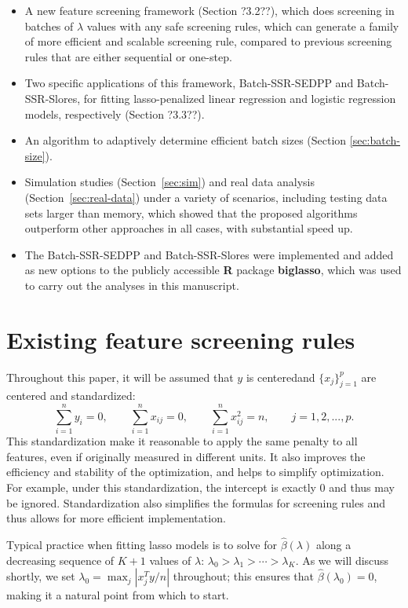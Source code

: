 \documentclass{article}
\begin{document}
\begin{itemize}
    \item A new feature screening framework (Section ?3.2??), which does screening in batches of $\lambda$ values with any safe screening rules, which can generate a family of more efficient and scalable screening rule, compared to previous screening rules that are either sequential or one-step.
    \item Two specific applications of this framework, Batch-SSR-SEDPP and Batch-SSR-Slores, for fitting lasso-penalized linear regression and logistic regression models, respectively (Section ?3.3??).
    \item An algorithm to adaptively determine efficient batch sizes (Section \ref{sec:batch-size}).
    \item Simulation studies (Section~\ref{sec:sim}) and real data analysis (Section~\ref{sec:real-data}) under a variety of scenarios, including testing data sets larger than memory, which showed that the proposed algorithms outperform other approaches in all cases, with substantial speed up.
    \item The Batch-SSR-SEDPP and Batch-SSR-Slores were implemented and added as new options to the publicly accessible \textbf{R} package \textbf{biglasso}\cite{zeng2017biglasso}, which was used to carry out the analyses in this manuscript.
\end{itemize}

\section{Existing feature screening rules}
\label{sec:existing}

Throughout this paper, it will be assumed that $y$ is centeredand $\{x_j\}_{j=1}^p$ are centered and standardized:
\begin{equation}
    \sum_{i=1}^ny_i=0, \qquad \sum_{i=1}^n x_{ij}=0, \qquad \sum_{i=1}^n x_{ij}^2=n,\qquad j=1,2,...,p.
\end{equation}
This standardization make it reasonable to apply the same penalty to all features, even if originally measured in different units. It also improves the efficiency and stability of the optimization, and helps to simplify optimization.  For example, under this standardization, the intercept is exactly 0 and thus may be ignored.  Standardization also simplifies the formulas for screening rules and thus allows for more efficient implementation.

Typical practice when fitting lasso models is to solve for $\hat{\beta}(\lambda)$ along a decreasing sequence of $K+1$ values of $\lambda$: $\lambda_0 > \lambda_1 > \cdots > \lambda_K$.  As we will discuss shortly, we set $\lambda_0=\max_j|x_j^Ty/n|$ throughout; this ensures that $\hat{\beta}(\lambda_0)=0$, making it a natural point from which to start.
\end{document}
